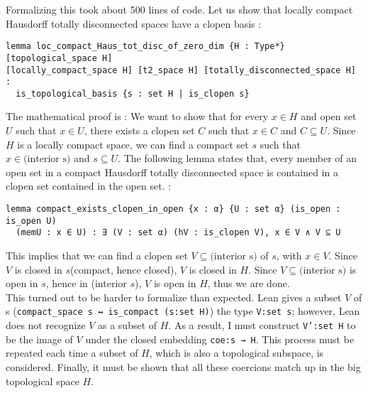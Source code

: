\documentclass[11pt]{article}
\newcommand{\lean}[1]{\texttt{#1}\xspace} %
\begin{document}
Formalizing this took about 500 lines of code. Let us show that locally compact Hausdorff
totally disconnected spaces have a clopen basis :

\begin{lstlisting}
lemma loc_compact_Haus_tot_disc_of_zero_dim {H : Type*} [topological_space H] 
[locally_compact_space H] [t2_space H] [totally_disconnected_space H] :
  is_topological_basis {s : set H | is_clopen s}
\end{lstlisting}

The mathematical proof is : We want to show that for every $x \in H$ and open set $U$ such that
$x \in U$, there exists a clopen set $C$ such that $x \in C$ and $C \subseteq U$. Since $H$ is a
locally compact space, we can find a compact set $s$ such that $x \in \text{(interior s)}$ and
$s \subseteq U$. The following lemma states that, every member of an open set in a compact Hausdorff 
totally disconnected space is contained in a clopen set contained in the open set. :
\begin{lstlisting}
lemma compact_exists_clopen_in_open {x : α} {U : set α} (is_open : is_open U) 
  (memU : x ∈ U) : ∃ (V : set α) (hV : is_clopen V), x ∈ V ∧ V ⊆ U
\end{lstlisting}
This implies that we can find a clopen set $V \subseteq \text{(interior s)}$ of $s$, with $x \in V$. 
Since $V$ is closed in $s$(compact, hence closed), $V$ is closed in $H$. Since
$V \subseteq \text{(interior s)}$ is open in $s$, hence in (interior $s$), $V$ is open in $H$, thus
we are done. \\

This turned out to be harder to formalize than expected. Lean gives a subset $V$ of s \newline (\lean{compact\_space s ↔ is\_compact (s:set H)}) 
the type \lean{V:set s}; however, Lean does not recognize $V$ as a subset of $H$. As a result, I must construct \lean{V':set H} 
to be the image of $V$ under the closed embedding \lean{coe:s → H}. This process must be repeated each time a subset of $H$, 
which is also a topological subspace, is considered. Finally, it must be shown that all these coercions match up in the big 
topological space $H$.

\end{document}
